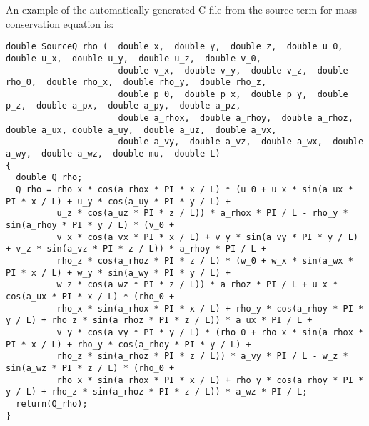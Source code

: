 \documentclass[10pt]{article}
\begin{document}
\begin{landscape}
\newpage
An example of the automatically generated C file from the source term for mass conservation equation is:
\begin{verbatim}
double SourceQ_rho (  double x,  double y,  double z,  double u_0,  double u_x,  double u_y,  double u_z,  double v_0,
                      double v_x,  double v_y,  double v_z,  double rho_0,  double rho_x,  double rho_y,  double rho_z,
                      double p_0,  double p_x,  double p_y,  double p_z,  double a_px,  double a_py,  double a_pz,
                      double a_rhox,  double a_rhoy,  double a_rhoz,  double a_ux, double a_uy,  double a_uz,  double a_vx,
                      double a_vy,  double a_vz,  double a_wx,  double a_wy,  double a_wz,  double mu,  double L)
{
  double Q_rho;
  Q_rho = rho_x * cos(a_rhox * PI * x / L) * (u_0 + u_x * sin(a_ux * PI * x / L) + u_y * cos(a_uy * PI * y / L) +
          u_z * cos(a_uz * PI * z / L)) * a_rhox * PI / L - rho_y * sin(a_rhoy * PI * y / L) * (v_0 +
          v_x * cos(a_vx * PI * x / L) + v_y * sin(a_vy * PI * y / L) + v_z * sin(a_vz * PI * z / L)) * a_rhoy * PI / L +
          rho_z * cos(a_rhoz * PI * z / L) * (w_0 + w_x * sin(a_wx * PI * x / L) + w_y * sin(a_wy * PI * y / L) +
          w_z * cos(a_wz * PI * z / L)) * a_rhoz * PI / L + u_x * cos(a_ux * PI * x / L) * (rho_0 +
          rho_x * sin(a_rhox * PI * x / L) + rho_y * cos(a_rhoy * PI * y / L) + rho_z * sin(a_rhoz * PI * z / L)) * a_ux * PI / L +
          v_y * cos(a_vy * PI * y / L) * (rho_0 + rho_x * sin(a_rhox * PI * x / L) + rho_y * cos(a_rhoy * PI * y / L) +
          rho_z * sin(a_rhoz * PI * z / L)) * a_vy * PI / L - w_z * sin(a_wz * PI * z / L) * (rho_0 +
          rho_x * sin(a_rhox * PI * x / L) + rho_y * cos(a_rhoy * PI * y / L) + rho_z * sin(a_rhoz * PI * z / L)) * a_wz * PI / L;
  return(Q_rho);
}
\end{verbatim}
 



\end{landscape}
\end{document}
